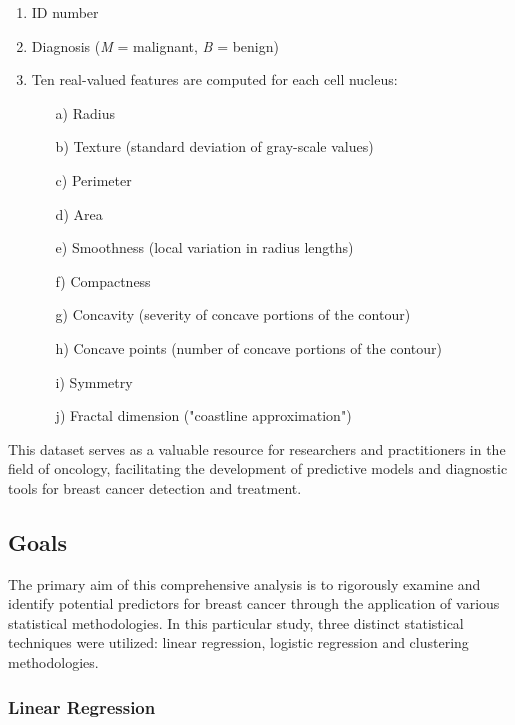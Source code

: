 \documentclass[conference]{IEEEtran}
\begin{document}
\begin{enumerate}
    \item ID number
    \item Diagnosis (\textit{M} = malignant, \textit{B} = benign)
    \item Ten real-valued features are computed for each cell nucleus:
    \begin{enumerate}
        \item[a)] Radius
        \item[b)] Texture (standard deviation of gray-scale values)
        \item[c)] Perimeter
        \item[d)] Area
        \item[e)] Smoothness (local variation in radius lengths)
        \item[f)] Compactness
        \item[g)] Concavity (severity of concave portions of the contour)
        \item[h)] Concave points (number of concave portions of the contour)
        \item[i)] Symmetry
        \item[j)] Fractal dimension ("coastline approximation")
    \end{enumerate}
\end{enumerate}

\vspace{0.2cm}
This dataset serves as a valuable resource for researchers and practitioners in the field of oncology, facilitating the development of predictive models and diagnostic tools for breast cancer detection and treatment.

\subsection{Goals}
The primary aim of this comprehensive analysis is to rigorously examine and identify potential predictors for breast cancer through the application of various statistical methodologies. In this particular study, three distinct statistical techniques were utilized: linear regression, logistic regression and clustering methodologies.

\vspace{0.2cm}

\subsubsection{Linear Regression}
\end{document}
